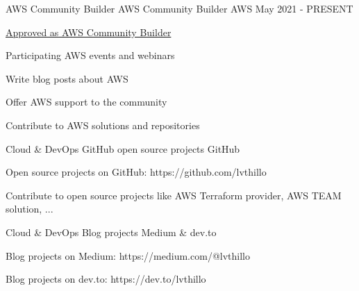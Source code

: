 \newpage
{}


\begin{cventries}

  \cventry
    {AWS Community Builder} %
    {AWS Community Builder} %
    {AWS} %
    {May 2021 - PRESENT} %
    {
      \begin{cvitems} %
        \item {\href{https://shorturl.at/bN2Cn}{Approved as AWS Community Builder}} %
        \item {Participating AWS events and webinars}
        \item {Write blog posts about AWS}
        \item {Offer AWS support to the community}
        \item {Contribute to AWS solutions and repositories}
      \end{cvitems}
    }

  \cventry
    {Cloud \& DevOps} %
    {GitHub open source projects} %
    {GitHub} %
    {} %
    {
      \begin{cvitems} %
        \item {Open source projects on GitHub: https://github.com/lvthillo} 
        \item {Contribute to open source projects like AWS Terraform provider, AWS TEAM solution, ...}
      \end{cvitems}
    }

  \cventry
    {Cloud \& DevOps} %
    {Blog projects} %
    {Medium \& dev.to} %
    {} %
    {
      \begin{cvitems} %
        \item {Blog projects on Medium: https://medium.com/@lvthillo}
        \item {Blog projects on dev.to: https://dev.to/lvthillo}
      \end{cvitems}
    }


\end{cventries}
